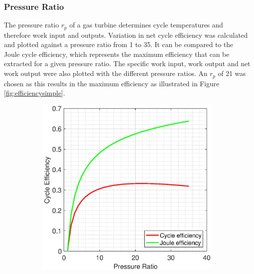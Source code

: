 \subsubsection{Pressure Ratio} 
The pressure ratio $r_p$ of a gas turbine determines cycle temperatures and therefore work input and outputs. Variation in net cycle efficiency was calculated and plotted against a pressure ratio from 1 to 35. It can be compared to the Joule cycle efficiency, which represents the maximum efficiency that can be extracted for a given pressure ratio. The specific work input, work output and net work output were also plotted with the different pressure ratios. An $r_p$ of 21 was chosen as this results in the maximum efficiency as illustrated in Figure \ref{fig:efficiencysimple}.
 \begin{figure} [h]
\centering
\begin{subfigure}{.7\textwidth}
\centering
 \includegraphics[width=0.9\linewidth]{./pictures/efficiencysimple.eps}
  \label{fig:efficiencysimplea}
\end{subfigure}
\begin{subfigure}{.7\textwidth}
 \centering

\end{subfigure}
\end{figure}
